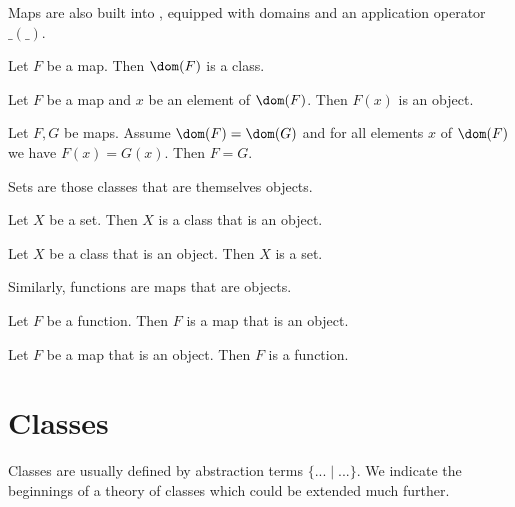 \documentclass{article}
\begin{document}
Maps are also built into \Naproche{}, equipped with
domains and an application operator $\_ ( \_ )$.

\begin{forthel}
  \begin{lemma}
    Let $F$ be a map.
    Then $\dom(F)$ is a class.
  \end{lemma}

  \begin{lemma}
    Let $F$ be a map and $x$ be an element of $\dom(F)$.
    Then $F(x)$ is an object.
  \end{lemma}

  \begin{lemma}[title=Map Extensionality]
    Let $F, G$ be maps.
    Assume $\dom(F) = \dom(G)$ and for all elements $x$ of $\dom(F)$ we have
    $F(x) = G(x)$.
    Then $F = G$.
  \end{lemma}
\end{forthel}

Sets are those classes that are themselves objects.

\begin{forthel}
  \begin{lemma}
    Let $X$ be a set.
    Then $X$ is a class that is an object.
  \end{lemma}

  \begin{lemma}
    Let $X$ be a class that is an object.
    Then $X$ is a set.
  \end{lemma}
\end{forthel}
%
Similarly, functions are maps that are objects.
\begin{forthel}
  \begin{lemma}
    Let $F$ be a function.
    Then $F$ is a map that is an object.
  \end{lemma}

  \begin{lemma}
    Let $F$ be a map that is an object.
    Then $F$ is a function.
  \end{lemma}
\end{forthel}

\section{Classes}

Classes are usually defined by
abstraction terms $\{ ... \mid ... \}$. We indicate the
beginnings of a theory of classes which could be extended
much further.
\end{document}
